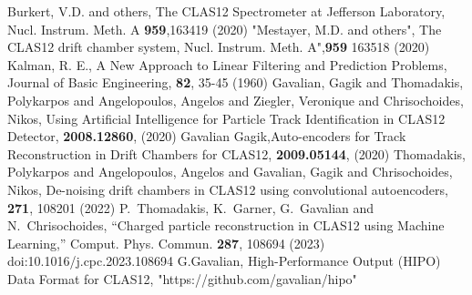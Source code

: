 \documentclass[preprint,12pt]{elsarticle}
\begin{document}
 \begin{thebibliography}{}
%
%
Burkert, V.D. and others, The CLAS12 Spectrometer at Jefferson Laboratory, Nucl. Instrum. Meth. A \textbf{959},163419 (2020)
 "Mestayer, M.D. and others", The CLAS12 drift chamber system, Nucl. Instrum. Meth. A",\textbf{959} 163518 (2020)
  Kalman, R. E., A New Approach to Linear Filtering and Prediction Problems, Journal of Basic Engineering, \textbf{82}, 35-45 (1960)
Gavalian, Gagik and Thomadakis, Polykarpos and Angelopoulos, Angelos and Ziegler, Veronique and Chrisochoides, Nikos, Using Artificial Intelligence for Particle Track Identification in CLAS12 Detector, \textbf{2008.12860}, (2020)
 Gavalian Gagik,Auto-encoders for Track Reconstruction in Drift Chambers for CLAS12, \textbf{2009.05144}, (2020)
   Thomadakis, Polykarpos and Angelopoulos, Angelos and Gavalian, Gagik and Chrisochoides, Nikos, De-noising drift chambers in CLAS12 using convolutional autoencoders, \textbf{271}, 108201 (2022)   
P.~Thomadakis, K.~Garner, G.~Gavalian and N.~Chrisochoides,
``Charged particle reconstruction in CLAS12 using Machine Learning,''
Comput. Phys. Commun. \textbf{287}, 108694 (2023) doi:10.1016/j.cpc.2023.108694
  G.Gavalian, High-Performance Output (HIPO) Data Format for CLAS12,  "https://github.com/gavalian/hipo"
\end{thebibliography}

%
%
\end{document}
